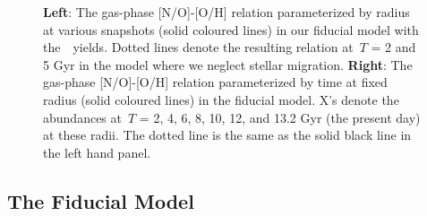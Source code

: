 \documentclass[ms.tex]{subfiles}
\begin{document}
\begin{figure}
\caption{
\textbf{Left}: The gas-phase [N/O]-[O/H] relation parameterized by radius at 
various snapshots (solid coloured lines) in our fiducial model with 
the~\cristallo~yields. 
Dotted lines denote the resulting relation at~$T$ = 2 and 5 Gyr in the model 
where we neglect stellar migration. 
\textbf{Right}: The gas-phase [N/O]-[O/H] relation parameterized by time at 
fixed radius (solid coloured lines) in the fiducial model. 
X's denote the abundances at~$T$ = 2, 4, 6, 8, 10, 12, and 13.2 Gyr (the 
present day) at these radii. 
The dotted line is the same as the solid black line in the left hand panel. 
} 
\label{fig:no_oh_timeevol} 
\end{figure} 

\subsection{The Fiducial Model} 
\label{sec:results:fiducial} 
\end{document}
